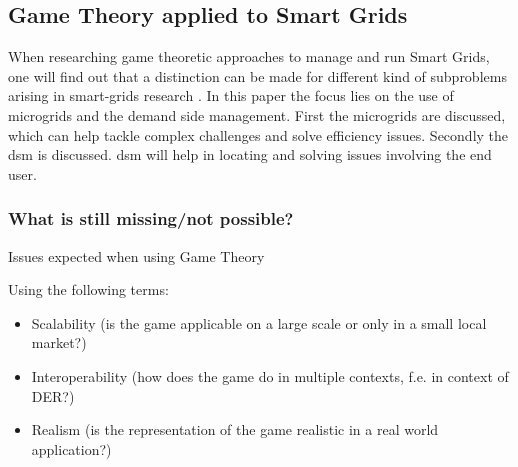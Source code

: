 \subsection{Game Theory applied to Smart Grids}
When researching game theoretic approaches to manage and run Smart Grids, one will find out that a distinction can be made for different kind of subproblems arising in smart-grids research \cite{keypaper}. In this paper the focus lies on the use of microgrids and the demand side management. First the microgrids are discussed, which can help tackle complex challenges and solve efficiency issues. Secondly the \gls{dsm} is discussed. \gls{dsm} will help in locating and solving issues involving the end user. 


\subsubsection{What is still missing/not possible?}

Issues expected when using Game Theory

Using the following terms:
\begin{itemize}
	\item Scalability (is the game applicable on a large scale or only in a small local market?)
	\item Interoperability (how does the game do in multiple contexts, f.e. in context of DER?)
	\item Realism (is the representation of the game realistic in a real world application?)
\end{itemize}